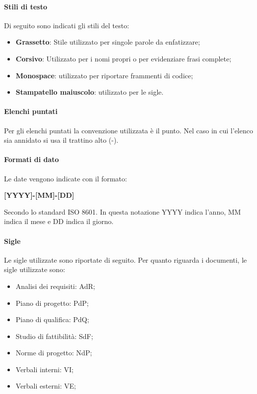 \documentclass[../norme_di_progetto.tex]{subfiles}
\begin{document}
\paragraph{Stili di testo}
Di seguito sono indicati gli stili del testo:
\begin{itemize}
    \item \textbf{Grassetto}: Stile utilizzato per singole parole da enfatizzare;
    \item \textbf{Corsivo}: Utilizzato per i nomi propri o per evidenziare frasi complete;
    \item \textbf{Monospace}: utilizzato per riportare frammenti di codice;
    \item \textbf{Stampatello maiuscolo}: utilizzato per le sigle.
\end{itemize}

\paragraph{Elenchi puntati}
Per gli elenchi puntati la convenzione utilizzata è il punto. Nel caso in cui l'elenco sia annidato si usa il trattino alto (-).

\paragraph{Formati di dato}
Le date vengono indicate con il formato:
\begin{center}
    \textbf{[YYYY]-[MM]-[DD]}
\end{center}
Secondo lo standard ISO 8601. In questa notazione YYYY indica l'anno, MM indica il mese e DD indica il giorno.

\paragraph{Sigle}
Le sigle utilizzate sono riportate di seguito.
Per quanto riguarda i documenti, le sigle utilizzate sono:
\begin{itemize}
    \item Analisi dei requisiti: AdR;
    \item Piano di progetto: PdP;
    \item Piano di qualifica: PdQ;
    \item Studio di fattibilità: SdF;
    \item Norme di progetto: NdP;
    \item Verbali interni: VI;
    \item Verbali esterni: VE;
\end{itemize}
\end{document}

